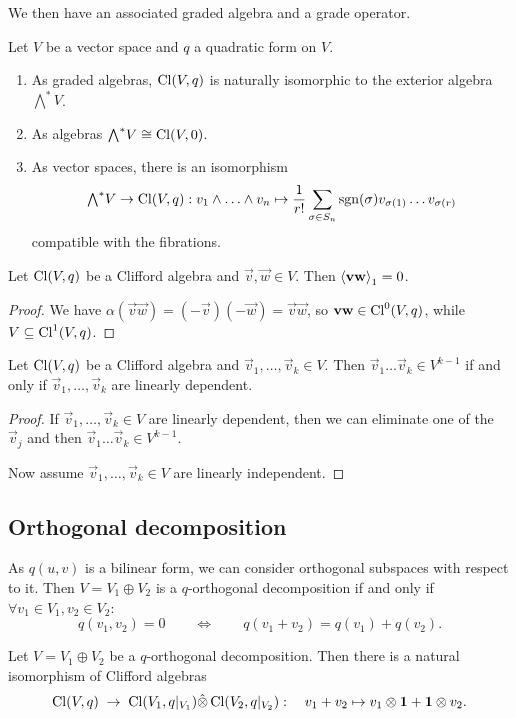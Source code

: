 We then have an associated graded algebra and a grade operator.

\begin{proposition}
Let $V$ be a vector space and $q$ a quadratic form on $V$.
\begin{enumerate}
\item As graded algebras, $\operatorname{Cl}(V,q)$ is naturally isomorphic to the exterior algebra ${\textstyle\bigwedge}^* V$.
\item As algebras ${\textstyle\bigwedge}^* V \cong \operatorname{Cl}(V,0)$.
\item As vector spaces, there is an isomorphism
\[ {\textstyle\bigwedge}^* V \to \operatorname{Cl}(V,q): v_1\wedge \ldots \wedge v_n \mapsto \frac{1}{r!}\sum_{\sigma\in S_n}\operatorname{sgn}(\sigma)v_{\sigma(1)}\hdots v_{\sigma(r)} \]
compatible with the fibrations.
\end{enumerate}
\end{proposition}

\begin{lemma}
Let $\operatorname{Cl}(V,q)$ be a Clifford algebra and $\vec{v},\vec{w}\in V$. Then $\left\langle \boldsymbol{\mathrm{v}}\boldsymbol{\mathrm{w}} \right\rangle_1 = 0$.
\end{lemma}
\begin{proof}
We have $\alpha(\vec{v}\vec{w}) = (-\vec{v})(-\vec{w}) = \vec{v}\vec{w}$, so $\boldsymbol{\mathrm{v}}\boldsymbol{\mathrm{w}}\in\operatorname{Cl}^0(V,q)$, while $V\subseteq \operatorname{Cl}^1(V,q)$.
\end{proof}

\begin{proposition}
Let $\operatorname{Cl}(V,q)$ be a Clifford algebra and $\vec{v}_1, \ldots, \vec{v}_k\in V$. Then $\vec{v}_1\ldots\vec{v}_k \in V^{k-1}$ \textup{if and only if} $\vec{v}_1,\ldots,\vec{v}_k$ are linearly dependent.
\end{proposition}
\begin{proof}
If $\vec{v}_1, \ldots, \vec{v}_k\in V$ are linearly dependent, then we can eliminate one of the $\vec{v}_j$ and then $\vec{v}_1\ldots\vec{v}_k \in V^{k-1}$.

Now assume $\vec{v}_1, \ldots, \vec{v}_k\in V$ are linearly independent.
\end{proof}

\subsection{Orthogonal decomposition}
As $q(u,v)$ is a bilinear form, we can consider orthogonal subspaces with respect to it. Then $V=V_1\oplus V_2$ is a $q$-orthogonal decomposition if and only if $\forall v_1\in V_1, v_2\in V_2$:
\[ q(v_1,v_2) = 0 \qquad \iff \qquad q(v_1+v_2) = q(v_1) + q(v_2). \]
\begin{proposition}
Let $V=V_1\oplus V_2$ be a $q$-orthogonal decomposition. Then there is a natural isomorphism of Clifford algebras
\[ \operatorname{Cl}(V,q) \;\to\; \operatorname{Cl}(V_1,q|_{V_1}) \hat{\otimes} \operatorname{Cl}(V_2, q|_{V_2}):\quad v_1+v_2\mapsto v_1\otimes \boldsymbol{\mathrm{1}} + \boldsymbol{\mathrm{1}}\otimes v_2. \]
\end{proposition}

